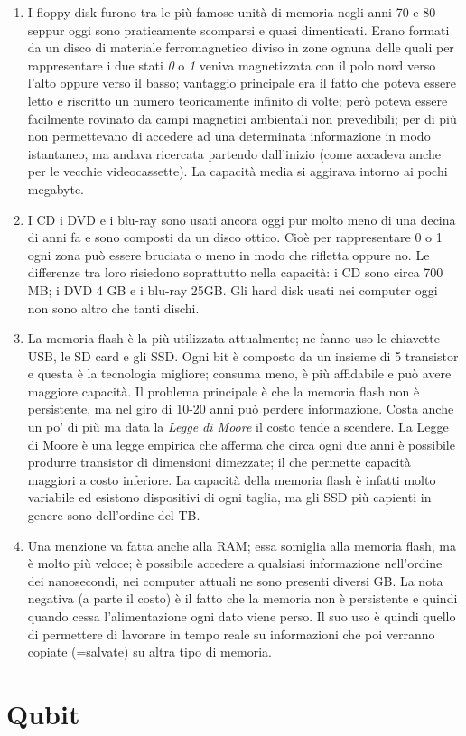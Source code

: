 \begin{enumerate}
\item I floppy disk furono tra le più famose unità di memoria negli anni 70 e 80 seppur oggi sono praticamente scomparsi e quasi dimenticati. Erano formati da un disco di materiale ferromagnetico diviso in zone ognuna delle quali per rappresentare i due stati \textit{0} o \textit{1} veniva magnetizzata con il polo nord verso l'alto oppure verso il basso; vantaggio principale era il fatto che poteva essere letto e riscritto un numero teoricamente infinito di volte; però poteva essere facilmente rovinato da campi magnetici ambientali non prevedibili; per di più non permettevano di accedere ad una determinata informazione in modo istantaneo, ma andava ricercata partendo dall'inizio (come accadeva anche per le vecchie videocassette). La capacità media si aggirava intorno ai pochi megabyte.
\item I CD i DVD e i blu-ray sono usati ancora oggi pur molto meno di una decina di anni fa e sono composti da un disco ottico. Cioè per rappresentare 0 o 1 ogni zona può essere bruciata o meno in modo che rifletta oppure no. Le differenze tra loro risiedono soprattutto nella capacità: i CD sono circa 700 MB; i DVD 4 GB e i blu-ray 25GB. Gli hard disk usati nei computer oggi non sono altro che tanti dischi.
\item La memoria flash è la più utilizzata attualmente; ne fanno uso le chiavette USB, le SD card e gli SSD. Ogni bit è composto da un insieme di 5 transistor e questa è la tecnologia migliore; consuma meno, è più affidabile e può avere maggiore capacità. Il problema principale è che la memoria flash non è persistente, ma nel giro di 10-20 anni può perdere informazione. Costa anche un po' di più ma data la \textit{Legge di Moore} il costo tende a scendere. La Legge di Moore è una legge empirica che afferma che circa ogni due anni è possibile produrre transistor di dimensioni dimezzate; il che permette capacità maggiori a costo inferiore. La capacità della memoria flash è infatti molto variabile ed esistono dispositivi di ogni taglia, ma gli SSD più capienti in genere sono dell'ordine del TB.
\item Una menzione va fatta anche alla RAM; essa somiglia alla memoria flash, ma è molto più veloce; è possibile accedere a qualsiasi informazione nell'ordine dei nanosecondi, nei computer attuali ne sono presenti diversi GB. La nota negativa (a parte il costo) è il fatto che la memoria non è persistente e quindi quando cessa l'alimentazione ogni dato viene perso. Il suo uso è quindi quello di permettere di lavorare in tempo reale su informazioni che poi verranno copiate (=salvate) su altra tipo di memoria.
\end{enumerate}
\section{Qubit}
